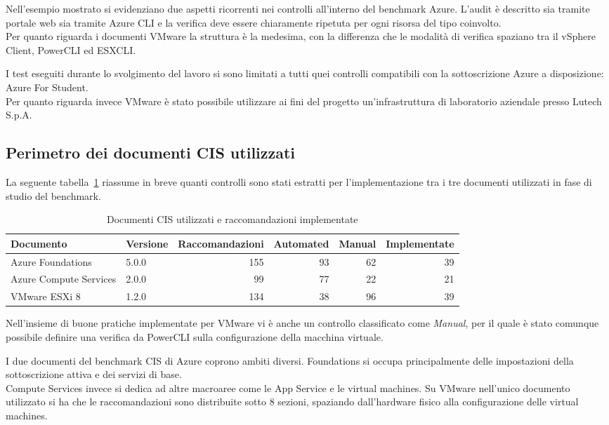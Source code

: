\documentclass[a4paper,11pt]{report}
\begin{document}
Nell'esempio mostrato si evidenziano due aspetti ricorrenti nei controlli all'interno del benchmark Azure.
L'audit è descritto sia tramite portale web sia tramite Azure CLI e la verifica deve essere chiaramente ripetuta per ogni risorsa del tipo coinvolto.\\
Per quanto riguarda i documenti VMware la struttura è la medesima, con la differenza che le modalità di verifica spaziano tra il vSphere Client, PowerCLI ed ESXCLI.

I test eseguiti durante lo svolgimento del lavoro si sono limitati a tutti quei controlli compatibili con la sottoscrizione Azure a disposizione: Azure For Student. \\
Per quanto riguarda invece VMware è stato possibile utilizzare ai fini del progetto un'infrastruttura di laboratorio aziendale presso Lutech S.p.A.


\subsection{Perimetro dei documenti CIS utilizzati}

La seguente tabella~\ref{tab:benchmark} riassume in breve quanti controlli sono stati estratti per l'implementazione tra i tre documenti utilizzati in fase di studio del benchmark.

\begin{table}[H]
\centering
\small
\begin{tabular}{llrrrr}
\hline
\textbf{Documento} & \textbf{Versione} & \textbf{Raccomandazioni} &
\textbf{Automated} & \textbf{Manual} & \textbf{Implementate} \\
\hline
Azure Foundations     & 5.0.0 & 155 & 93 & 62 & 39 \\
Azure Compute Services & 2.0.0 &  99 & 77 & 22 & 21 \\
VMware ESXi 8         & 1.2.0 & 134 & 38 & 96 & 39 \\
\hline
\end{tabular}
\caption{Documenti CIS utilizzati e raccomandazioni implementate}
\label{tab:benchmark}
\end{table}


Nell'insieme di buone pratiche implementate per VMware vi è anche un controllo classificato come \emph{Manual}, per il quale è stato comunque possibile definire una verifica da PowerCLI sulla configurazione della macchina virtuale.

I due documenti del benchmark CIS di Azure coprono ambiti diversi.
Foundations si occupa principalmente delle impostazioni della sottoscrizione attiva e dei servizi di base.\\
Compute Services invece si dedica ad altre macroaree come le App Service e le virtual machines.
Su VMware nell'unico documento utilizzato si ha che le raccomandazioni sono distribuite sotto 8 sezioni, spaziando dall'hardware fisico alla configurazione delle virtual machines.
\end{document}
